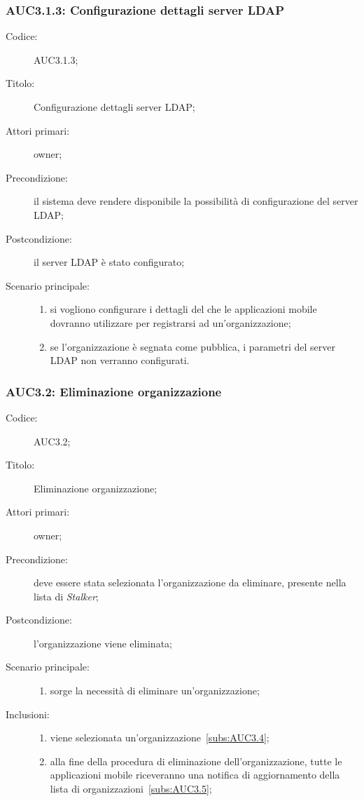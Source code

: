 \documentclass[../../../analisi-dei-requisiti.tex]{subfiles}
\begin{document}
\subsubsection{AUC3.1.3: Configurazione dettagli server LDAP}%
\label{subs:AUC3.1.3}
\begin{description}
  \item[Codice:] AUC3.1.3;
  \item[Titolo:] Configurazione dettagli server LDAP;
  \item[Attori primari:] owner;
  \item[Precondizione:] il sistema deve rendere disponibile la possibilità di configurazione del server LDAP;
  \item[Postcondizione:] il server LDAP è stato configurato;
  \item[Scenario principale:]
        \begin{enumerate}
          \item si vogliono configurare i dettagli del  che le applicazioni mobile dovranno utilizzare per registrarsi ad un'organizzazione;
          \item se l'organizzazione è segnata come pubblica, i parametri del server LDAP non verranno configurati.
        \end{enumerate}
\end{description}

\subsubsection{AUC3.2: Eliminazione organizzazione}%
\label{subs:AUC3.2}
\begin{description}
  \item[Codice:] AUC3.2;
  \item[Titolo:] Eliminazione organizzazione;
  \item[Attori primari:] owner;
  \item[Precondizione:] deve essere stata selezionata l'organizzazione da eliminare, presente nella lista di \emph{Stalker};
  \item[Postcondizione:] l'organizzazione viene eliminata;
  \item[Scenario principale:]
        \begin{enumerate}
          \item sorge la necessità di eliminare un'organizzazione;
        \end{enumerate}
  \item[Inclusioni:]
        \begin{enumerate}
          \item viene selezionata un'organizzazione~\ref{subs:AUC3.4};
          \item alla fine della procedura di eliminazione dell'organizzazione, tutte le applicazioni mobile riceveranno una notifica di aggiornamento della lista di organizzazioni~\ref{subs:AUC3.5};
        \end{enumerate}
\end{description}
\end{document}
